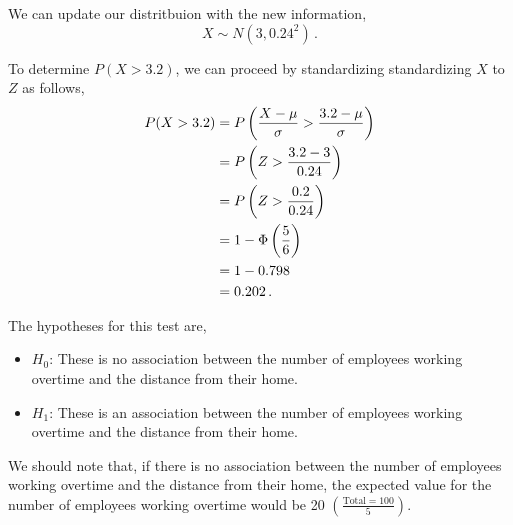\begin{subquestions}
\begin{subsubquestions}

\subsubquestion

We can update our distritbuion with the new information,
\begin{equation}
	X \sim N(3,0.24^2) \,.
\end{equation}

To determine $P(X>3.2)$, we can proceed by standardizing standardizing $X$ to $Z$ as follows,
\begin{align}
	P(X>3.2) & = P\left(\frac{X-\mu}{\sigma}>\frac{3.2-\mu}{\sigma} \right) \nonumber \\
	         & = P\left(Z>\frac{3.2-3}{0.24} \right) \nonumber \\
	         & = P\left(Z>\frac{0.2}{0.24} \right) \nonumber \\
	         & = 1 - \Phi\left(\frac{5}{6}\right) \nonumber \\
	         & = 1 - 0.798 \nonumber \\
	         & = 0.202 \,.
\end{align}

\end{subsubquestions}


\subquestion

\begin{subsubquestions}
	
\subsubquestion

The hypotheses for this test are,
\begin{itemize}
	\item $H_0$: These is no association between the number of employees working overtime and the distance from their home.
	\item $H_1$: These is an association between the number of employees working overtime and the distance from their home.
\end{itemize}
	

\subsubquestion

We should note that, if there is no association between the number of employees working overtime and the distance from their home, the expected value for the number of employees working overtime would be 20 $(\frac{\text{Total}=100}{5})$. 


\end{subsubquestions}
\end{subquestions}
